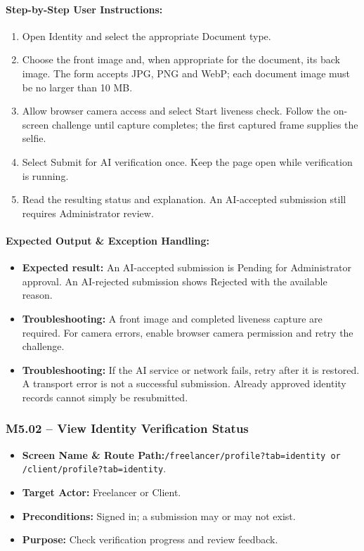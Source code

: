 \paragraph{Step-by-Step User Instructions:}
\begin{enumerate}[leftmargin=1.8em,itemsep=3pt]
  \item {} Open Identity and select the appropriate Document type.
  \item {} Choose the front image and, when appropriate for the document, its back image. The form accepts JPG, PNG and WebP; each document image must be no larger than 10 MB.
  \item {} Allow browser camera access and select Start liveness check. Follow the on-screen challenge until capture completes; the first captured frame supplies the selfie.
  \item {} Select Submit for AI verification once. Keep the page open while verification is running.
  \item {} Read the resulting status and explanation. An AI-accepted submission still requires Administrator review.
\end{enumerate}
\paragraph{Expected Output \& Exception Handling:}
\begin{itemize}[leftmargin=1.5em,itemsep=2pt]
  \item \textbf{Expected result:} An AI-accepted submission is Pending for Administrator approval. An AI-rejected submission shows Rejected with the available reason.
  \item \textbf{Troubleshooting:} A front image and completed liveness capture are required. For camera errors, enable browser camera permission and retry the challenge.
  \item \textbf{Troubleshooting:} If the AI service or network fails, retry after it is restored. A transport error is not a successful submission. Already approved identity records cannot simply be resubmitted.
\end{itemize}

\newpage
\subsubsection{M5.02 -- View Identity Verification Status}
\begin{itemize}[leftmargin=1.5em,itemsep=2pt]
  \item \textbf{Screen Name \& Route Path:}\newline \texttt{/freelancer/profile?tab=identity or /client/profile?tab=identity}.
  \item \textbf{Target Actor:} Freelancer or Client.
  \item \textbf{Preconditions:} Signed in; a submission may or may not exist.
  \item \textbf{Purpose:} Check verification progress and review feedback.
\end{itemize}
